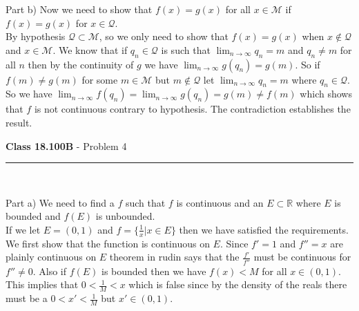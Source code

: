 \documentclass[11pt,reqno]{article}
\begin{document}
\noindent Part b) Now we need to show that $f(x) = g(x)$ for all $x \in \mathcal{M}$ if $f(x) = g(x)$ for $x \in \mathcal{Q}$.\\
\indent By hypothesis $\mathcal{Q} \subset \mathcal{M}$, so we only need to show that $f(x) = g(x)$ when $x \notin \mathcal{Q}$ and $x \in \mathcal{M}$. We know that if $q_n \in \mathcal{Q}$ is such that $\lim_{n \to \infty} q_n = m$ and $q_n \neq m$ for all $n$ then by the continuity of $g$ we have $\lim_{n \to \infty} g(q_n) = g(m)$. So if $f(m) \neq g(m)$ for some $m \in \mathcal{M}$ but $m \notin \mathcal{Q}$ let $\lim_{n \to \infty} q_n = m$ where $q_n \in \mathcal{Q}$. So we have $\lim_{n \to \infty} f(q_n) = \lim_{n \to \infty} g(q_n) = g(m) \neq f(m)$ which shows that $f$ is not continuous contrary to hypothesis. The contradiction establishes the result.

\vspace{15pt}
\begin{flushleft} 
\textbf{Class 18.100B} - Problem 4\\
\rule{500pt}{1pt}\\
\end{flushleft} 

\noindent Part a) We need to find a $f$ such that $f$ is continuous and an $E \subset \mathbb{R}$ where $E$ is bounded and $f(E)$ is unbounded.\\
\indent If we let $E = (0,1)$ and $f = \{ \frac{1}{x} | x \in E \}$ then we have satisfied the requirements. We first show that the function is continuous on $E$. Since $f' = 1$ and $f'' = x$ are plainly continuous on $E$ theorem in rudin says that the $\frac{f'}{f''}$ must be continuous for $f'' \neq 0$. Also if $f(E)$ is bounded then we have $f(x) < M$ for all $x \in (0,1)$. This implies that $0 < \frac{1}{M} < x$ which is false since by the density of the reals there must be a $0 < x' < \frac{1}{M}$ but $x' \in (0,1)$.\\
\end{document}
